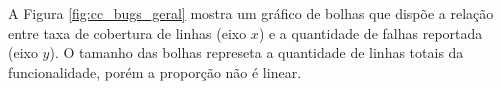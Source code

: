 \documentclass[11.5pt]{article}
\begin{document}

A Figura \ref{fig:cc_bugs_geral} mostra um gráfico de bolhas que dispõe a relação entre taxa de
cobertura de linhas (eixo $x$) e a quantidade de falhas reportada (eixo $y$).
O tamanho das bolhas represeta a quantidade de linhas totais da funcionalidade, porém a proporção
não é linear.
\end{document}
